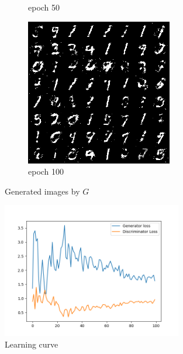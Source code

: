 \documentclass[a4paper]{article}
\theoremstyle{definition}
\newenvironment{soln}{
	\leavevmode\color{blue}\ignorespaces
}{}
\begin{document}
\begin{enumerate} [label=(\alph*)]
\begin{figure}[H]
\begin{subfigure}[b]{0.3\textwidth}
				\caption{epoch 50}
			\end{subfigure}
			\hfill
			\begin{subfigure}[b]{0.3\textwidth}
				\centering
				\includegraphics[width=\textwidth]{gan_q1_epoch100.png}
				\caption{epoch 100}
			\end{subfigure}
			\caption{Generated images by $G$}
			\label{fig:three graphs}
		\end{figure}
		
		
		\begin{soln}
			\begin{figure}[H]
				\centering
				\includegraphics[width=0.7\textwidth]{../figs/loss.png}
				\caption{Learning curve}
				\label{fig:q1_loss}
			\end{figure}
			

\end{soln}
\end{enumerate}
\end{document}
